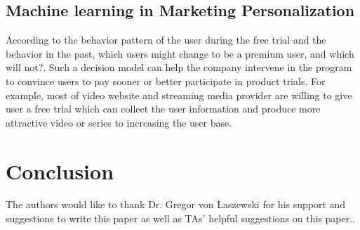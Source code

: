 \documentclass[sigconf]{acmart}
\begin{document}
\subsection{Machine learning in Marketing Personalization}
According to the behavior pattern of the user during the free trial and the behavior in the past, which users might change to be a premium user, and which will not?. Such a decision model can help the company intervene in the program to convince users to pay sooner or better participate in product trials. For example, most of video website and streaming media provider are willing to give user a free trial which can collect the user information and produce more attractive video or series to increasing the user base\cite{Bernard01}.
\section{Conclusion}



\begin{acks}

  The authors would like to thank Dr. Gregor von Laszewski for his support and suggestions to write this paper as well as TAs' helpful suggestions on this paper.. 

\end{acks}


 
\end{document}
